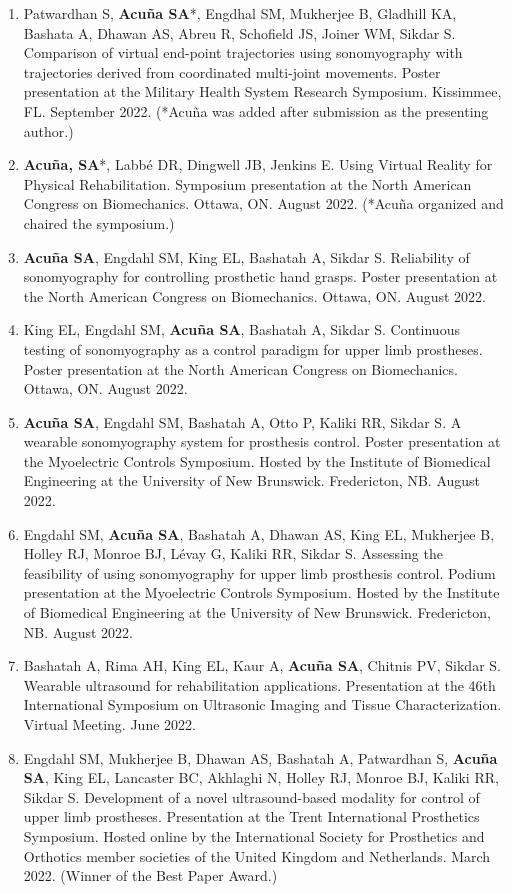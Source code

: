 \documentclass[letterpaper, 10pt]{article}
\begin{document}
\begin{enumerate}
    \item Patwardhan S, \textbf{Acuña SA}*, Engdhal SM, Mukherjee B, Gladhill KA, Bashata A, Dhawan AS, Abreu R, Schofield JS, Joiner WM,  Sikdar S. Comparison of virtual end-point trajectories using sonomyography with trajectories derived from coordinated multi-joint movements. Poster presentation at the Military Health System Research Symposium. Kissimmee, FL. September 2022. (*Acuña was added after submission as the presenting author.)
    \item \textbf{Acuña, SA}*, Labbé DR, Dingwell JB, Jenkins E. Using Virtual Reality for Physical Rehabilitation. Symposium presentation at the North American Congress on Biomechanics. Ottawa, ON. August 2022. (*Acuña organized and chaired the symposium.)
    \item \textbf{Acuña SA}, Engdahl SM, King EL, Bashatah A, Sikdar S. Reliability of sonomyography for controlling prosthetic hand grasps. Poster presentation at the North American Congress on Biomechanics. Ottawa, ON. August 2022.
    \item King EL, Engdahl SM, \textbf{Acuña SA}, Bashatah A, Sikdar S. Continuous testing of sonomyography as a control paradigm for upper limb prostheses. Poster presentation at the North American Congress on Biomechanics. Ottawa, ON. August 2022.
    \item \textbf{Acuña SA}, Engdahl SM, Bashatah A, Otto P, Kaliki RR, Sikdar S. A wearable sonomyography system for prosthesis control. Poster presentation at the Myoelectric Controls Symposium. Hosted by the Institute of Biomedical Engineering at the University of New Brunswick. Fredericton, NB. August 2022.
    \item Engdahl SM, \textbf{Acuña SA}, Bashatah A, Dhawan AS, King EL, Mukherjee B, Holley RJ, Monroe BJ, Lévay G, Kaliki RR, Sikdar S. Assessing the feasibility of using sonomyography for upper limb prosthesis control. Podium presentation at the Myoelectric Controls Symposium. Hosted by the Institute of Biomedical Engineering at the University of New Brunswick. Fredericton, NB. August 2022.
    \item Bashatah A, Rima AH, King EL, Kaur A, \textbf{Acuña SA}, Chitnis PV, Sikdar S. Wearable ultrasound for rehabilitation applications. Presentation at the 46th International Symposium on Ultrasonic Imaging and Tissue Characterization. Virtual Meeting. June 2022.
    \item Engdahl SM, Mukherjee B, Dhawan AS, Bashatah A, Patwardhan S, \textbf{Acuña SA}, King EL, Lancaster BC, Akhlaghi N, Holley RJ, Monroe BJ, Kaliki RR, Sikdar S. Development of a novel ultrasound-based modality for control of upper limb prostheses. Presentation at the Trent International Prosthetics Symposium. Hosted online by the International Society for Prosthetics and Orthotics member societies of the United Kingdom and Netherlands. March 2022. (Winner of the Best Paper Award.)

\end{enumerate}
\end{document}
